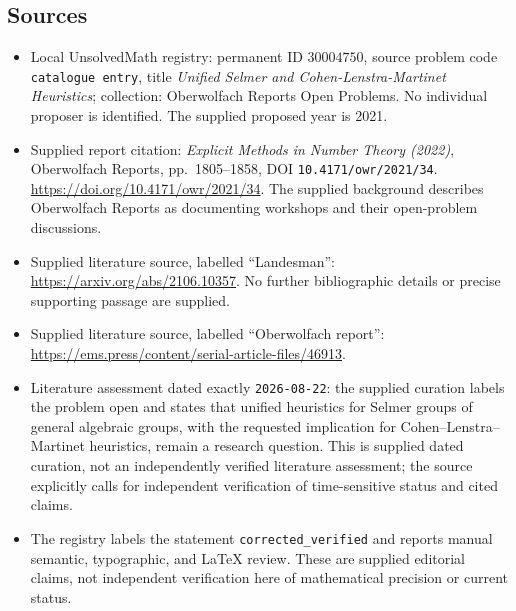 \documentclass[11pt]{article}
\begin{document}
\subsection{Sources}
\begin{itemize}
\item Local UnsolvedMath registry: permanent ID \(30004750\), source problem code \texttt{catalogue entry}, title \emph{Unified Selmer and Cohen-Lenstra-Martinet Heuristics}; collection: Oberwolfach Reports Open Problems. No individual proposer is identified. The supplied proposed year is 2021.
\item Supplied report citation: \emph{Explicit Methods in Number Theory (2022)}, Oberwolfach Reports, pp.\ 1805--1858, DOI \texttt{10.4171/owr/2021/34}. \url{https://doi.org/10.4171/owr/2021/34}. The supplied background describes Oberwolfach Reports as documenting workshops and their open-problem discussions.
\item Supplied literature source, labelled ``Landesman'': \url{https://arxiv.org/abs/2106.10357}. No further bibliographic details or precise supporting passage are supplied.
\item Supplied literature source, labelled ``Oberwolfach report'': \url{https://ems.press/content/serial-article-files/46913}.
\item Literature assessment dated exactly \texttt{2026-08-22}: the supplied curation labels the problem open and states that unified heuristics for Selmer groups of general algebraic groups, with the requested implication for Cohen--Lenstra--Martinet heuristics, remain a research question. This is supplied dated curation, not an independently verified literature assessment; the source explicitly calls for independent verification of time-sensitive status and cited claims.
\item The registry labels the statement \texttt{corrected\_verified} and reports manual semantic, typographic, and LaTeX review. These are supplied editorial claims, not independent verification here of mathematical precision or current status.
\end{itemize}
\end{document}

